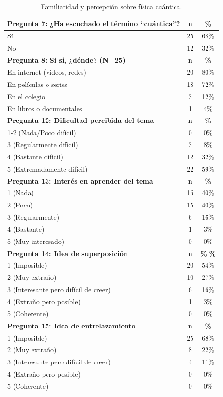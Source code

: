 \documentclass[10pt,a4paper]{article}
\begin{document}
\begin{table}[H]
\centering
\caption{Familiaridad y percepción sobre física cuántica.}
\begin{tabular}{|l|c|c|}
\hline
\textbf{Pregunta 7: ¿Ha escuchado el término ``cuántica''?} & \textbf{n} & \textbf{\%} \\
\hline
Sí & 25 & 68\% \\
No & 12 & 32\% \\
\hline
\textbf{Pregunta 8: Si sí, ¿dónde? (N=25)} & \textbf{n} & \textbf{\%} \\
\hline
En internet (videos, redes) & 20 & 80\% \\
En películas o series & 18 & 72\% \\
En el colegio & 3 & 12\% \\
En libros o documentales & 1 & 4\% \\
\hline
\textbf{Pregunta 12: Dificultad percibida del tema} & \textbf{n} & \textbf{\%} \\
\hline
1-2 (Nada/Poco difícil) & 0 & 0\% \\
3 (Regularmente difícil) & 3 & 8\% \\
4 (Bastante difícil) & 12 & 32\% \\
5 (Extremadamente difícil) & 22 & 59\% \\
\hline
\textbf{Pregunta 13: Interés en aprender del tema} & \textbf{n} & \textbf{\%} \\
\hline
1 (Nada) & 15 & 40\% \\
2 (Poco) & 15 & 40\% \\
3 (Regularmente) & 6 & 16\% \\
4 (Bastante) & 1 & 3\% \\
5 (Muy interesado) & 0 & 0\% \\
\hline
\textbf{Pregunta 14: Idea de superposición} & \textbf{n} & \textbf{\%} 
\textbf{\%} \\
\hline
1 (Imposible) & 20 & 54\% \\
2 (Muy extraño) & 10 & 27\% \\
3 (Interesante pero difícil de creer) & 6 & 16\% \\
4 (Extraño pero posible) & 1 & 3\% \\
5 (Coherente) & 0 & 0\% \\
\hline
\textbf{Pregunta 15: Idea de entrelazamiento} & \textbf{n} & \textbf{\%} \\
\hline
1 (Imposible) & 25 & 68\% \\
2 (Muy extraño) & 8 & 22\% \\
3 (Interesante pero difícil de creer) & 4 & 11\% \\
4 (Extraño pero posible) & 0 & 0\% \\
5 (Coherente) & 0 & 0\% \\
\hline
\end{tabular}
\end{table}
\clearpage
\end{document}
